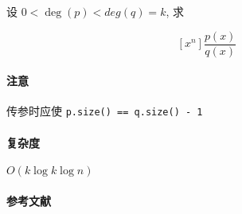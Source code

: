 设 \(0<\deg(p)<deg(q)=k\), 求

\[
    \left[x^n\right]\frac{p(x)}{q(x)}
\]

\paragraph{注意}

传参时应使 \verb|p.size() == q.size() - 1|

\paragraph{复杂度}

\(O(k\log k\log n)\)

\paragraph{参考文献} \cite{bostan2021simple}
